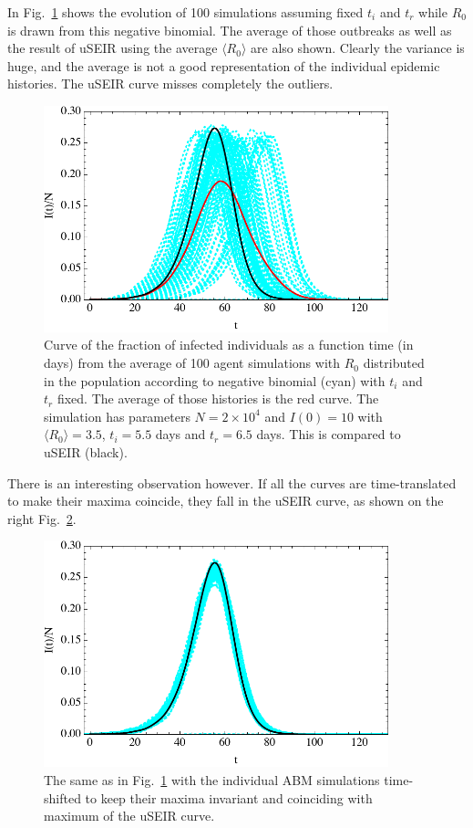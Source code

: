 \documentclass[10pt,letterpaper]{article}
\begin{document}
  In Fig.~\ref{fig:turtlesraw} shows the evolution of 100 simulations assuming fixed $t_i$ and $t_r$ while $R_0$ is drawn from this negative binomial. The average of those outbreaks as well as the result of
  uSEIR using the average $\langle R_0\rangle$ are also shown. Clearly the variance is huge, and the average is not a good representation of the individual epidemic histories. The uSEIR curve misses completely the outliers.

 \begin{figure}[h!]
  \centering
\includegraphics[width=10cm]{turtlesraw.pdf}
  \caption{ Curve of the fraction of infected individuals as a function time (in days) from the average of 100 agent simulations with $R_0$ distributed in the population according to negative binomial (cyan) with $t_i$ and $t_r$ fixed. The average of those histories is the red curve. The simulation has parameters  $N= 2 \times 10^4$ and $I(0)=10$ with $\langle R_0\rangle=3.5$, $t_i=5.5$ days and $t_r=6.5$ days. This is compared to uSEIR (black).}
  \label{fig:turtlesraw}
   \end{figure}
  There is an interesting observation however. If all the curves are time-translated  to make their maxima coincide, they fall in the uSEIR curve, as shown on the right Fig.~\ref{fig:turtlesshift}.
  \begin{figure}[h!]
  \centering
\includegraphics[width=10cm]{turtlesshift.pdf}
  \caption{ The same as in Fig.~\ref{fig:turtlesraw} with the individual ABM simulations time-shifted to keep their maxima invariant and coinciding with maximum of the uSEIR curve.}
  \label{fig:turtlesshift}
   \end{figure}
\end{document}
